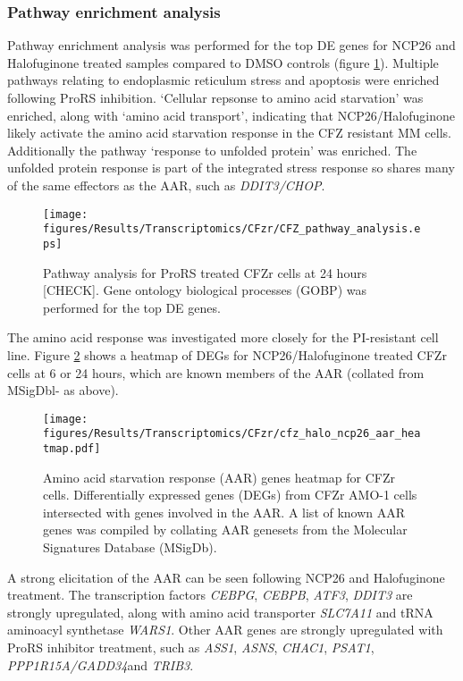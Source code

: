 \subsubsection{Pathway enrichment analysis}
Pathway enrichment analysis was performed for the top DE genes for NCP26 and Halofuginone treated samples compared to DMSO controls (figure \ref{fig:cfz_pathway}).
Multiple pathways relating to endoplasmic reticulum stress and apoptosis were enriched following ProRS inhibition.
`Cellular repsonse to amino acid starvation' was enriched, along with `amino acid transport', indicating that NCP26/Halofuginone likely activate the amino acid starvation response in the CFZ resistant MM cells.
Additionally the pathway `response to unfolded protein' was enriched.
The unfolded protein response is part of the integrated stress response so shares many of the same effectors as the AAR, such as \textit{DDIT3/CHOP}.

\begin{figure}[htb]
\centering
\texttt{[image: figures/Results/Transcriptomics/CFzr/CFZ\_pathway\_analysis.eps]}
\caption[Pathway analysis for ProRS inhibitor-treated CFZr cells]{Pathway analysis for ProRS treated CFZr cells at 24 hours [CHECK].
Gene ontology biological processes (GOBP) was performed for the top DE genes.
}
\label{fig:cfz_pathway}
\end{figure}
%
The amino acid response was investigated more closely for the PI-resistant cell line.
Figure \ref{fig:cfz_aar_heatmap} shows a heatmap of DEGs for NCP26/Halofuginone treated CFZr cells at 6 or 24 hours, which are known members of the AAR (collated from MSigDbl- as above).

\begin{figure}[p]
\centering
\texttt{[image: figures/Results/Transcriptomics/CFzr/cfz\_halo\_ncp26\_aar\_heatmap.pdf]}
\caption[Amino acid starvation response genes heatmap CFZr cells]{Amino acid starvation response (AAR) genes heatmap for CFZr cells.
Differentially expressed genes (DEGs) from CFZr AMO-1 cells intersected with genes involved in the AAR.
A list of known AAR genes was compiled by collating AAR genesets from the Molecular Signatures Database (MSigDb).
}
\label{fig:cfz_aar_heatmap}
\end{figure}
A strong elicitation of the AAR can be seen following NCP26 and Halofuginone treatment.
The transcription factors \textit{CEBPG}, \textit{CEBPB}, \textit{ATF3}, \textit{DDIT3} are strongly upregulated, along with amino acid transporter \textit{SLC7A11} and tRNA aminoacyl synthetase \textit{WARS1}.
Other AAR genes are strongly upregulated with ProRS inhibitor treatment, such as \textit{ASS1}, \textit{ASNS}, \textit{CHAC1}, \textit{PSAT1}, \textit{PPP1R15A/GADD34}and \textit{TRIB3}.

